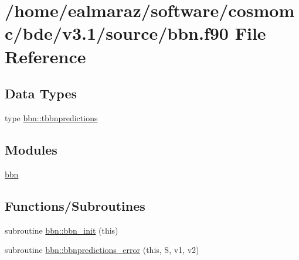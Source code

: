\hypertarget{bbn_8f90}{}\section{/home/ealmaraz/software/cosmomc/bde/v3.1/source/bbn.f90 File Reference}
\label{bbn_8f90}
\subsection*{Data Types}
\begin{DoxyCompactItemize}
\item 
type \mbox{\hyperlink{structbbn_1_1tbbnpredictions}{bbn\+::tbbnpredictions}}
\end{DoxyCompactItemize}
\subsection*{Modules}
\begin{DoxyCompactItemize}
\item 
 \mbox{\hyperlink{namespacebbn}{bbn}}
\end{DoxyCompactItemize}
\subsection*{Functions/\+Subroutines}
\begin{DoxyCompactItemize}
\item 
subroutine \mbox{\hyperlink{namespacebbn_a7da9f22f9be32950185f79ed74e69f4d}{bbn\+::bbn\+\_\+init}} (this)
\item 
subroutine \mbox{\hyperlink{namespacebbn_a89ea6267ce0d1cfa1ff459d517558a53}{bbn\+::bbnpredictions\+\_\+error}} (this, S, v1, v2)
\end{DoxyCompactItemize}
